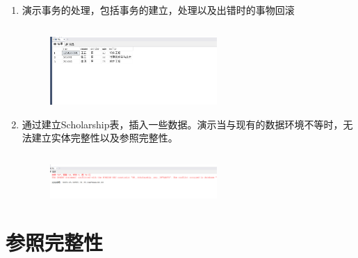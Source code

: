 \documentclass[a4paper,twoside]{article}
\begin{document}
\begin{spacing}{1.2}
\begin{enumerate}
  \item 演示事务的处理，包括事务的建立，处理以及出错时的事物回滚
  \inputminted[firstline=35,lastline=43]{sql}{../code/1.sql}
  \begin{figure}[H]
    \centering
    \includegraphics[width=0.6\textwidth]{3.png}
  \end{figure}
  \item 通过建立Scholarship表，插入一些数据。演示当与现有的数据环境不等时，无法建立实体完整性以及参照完整性。
  \inputminted[firstline=46,lastline=55]{sql}{../code/1.sql}
  \begin{figure}[H]
    \centering
    \includegraphics[width=0.6\textwidth]{4.png}
  \end{figure}
\end{enumerate}

\section{参照完整性}


\end{spacing}
\end{document}
